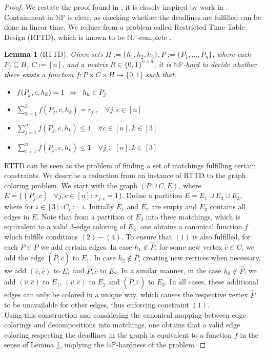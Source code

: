 \documentclass[11pt]{article}
\newcommand{\Hquad}{\hspace{0.5em}}
\newtheorem{lemma}[theorem]{Lemma}
\begin{document}
\begin{proof}
We restate the proof found in \cite{schnaars_21}, it is closely inspired by work in \cite{bonuccelli_01}.\\
Containment in $\mathbb{NP}$ is clear, as checking whether the deadlines are fulfilled can be done in linear time. We reduce from a problem called Restricted Time Table Design (RTTD), which is known to be $\mathbb{NP}$-complete \cite{even_1975}.
\begin{lemma}[RTTD]\label{lemma:rttd}
Given sets $H:= \{h_1,h_2,h_3\}, P := \{P_1,...,P_n\}$, where each $P_j \subseteq H$, $C := [n]$, and a matrix $R \in \{0,1\}^{n \times n}$, it is $\mathbb{NP}$-hard to  decide whether there exists a function $f: P \times C \times H \rightarrow \{0,1\}$ such that:
\begin{itemize}
    \item[(1)] $f(P_j,c,h_k) = 1 \Hquad \Rightarrow \Hquad h_k \in P_j$
    \item[(2)] $\sum_{k=1}^3 f(P_j,c,h_k) = r_{j,c} \quad \forall j,c\in [n]$
    \item[(3)] $\sum_{j=1}^n f(P_j,c,h_k) \le 1 \quad \forall c \in [n], k \in [3]$
    \item[(4)] $\sum_{c=1}^n f(P_j,c,h_k) \le 1 \quad \forall j \in [n], k \in [3]$
\end{itemize}
\end{lemma}
RTTD can be seen as the problem of finding a set of matchings fulfilling certain constraints. We describe a reduction from an instance of RTTD to the graph coloring problem. We start with the graph $(P\cup C, E)$, where $E = \{(P_j,c) \ |\ \forall j,c \in [n]:\ r_{j,c} = 1\}$. Define a partition $E = E_1 \cup E_2 \cup E_3$, where for $i \in [3]: C_i := i$. Initially $E_1$ and $E_2$ are empty and $E_3$ contains all edges in $E$. Note that from a partition of $E_3$ into three matchings, which is equivalent to a valid $3$-edge coloring of $E_3$, one obtains a canonical function $f$ which fulfills conditions $(2)-(4)$. To ensure that $(1)$ is also fulfilled, for each $\hat{P} \in P$ we add certain edges. In case $h_1 \not\in \hat{P}$, for some new vertex $\hat{c} \in C$, we add the edge $(\hat{P},\hat{c})$ to $E_1$. In case $h_2 \not\in \hat{P}$, creating new vertices when necessary, we add $(\hat{v},\hat{c})$ to $E_1$ and $\hat{P},\hat{c}$ to $E_2$. In a similar manner, in the case $h_3 \not\in \hat{P}$, we add $(\hat{v},\hat{c})$ to $E_1$, $(\hat{v},\hat{c})$ to $E_2$ and $(\hat{P}, \hat{c})$ to $E_3$. In all cases, these additional edges can only be colored in a unique way, which causes the respective vertex $\hat{P}$ to be unavailable for other edges, thus enforcing constraint $(1)$.\\
Using this construction and considering the canonical mapping between edge colorings and decompositions into matchings, one obtains that a valid edge coloring respecting the deadlines in the graph is equivalent to a function $f$ in the sense of Lemma \ref{lemma:rttd}, implying the $\mathbb{NP}$-hardness of the problem.
\end{proof}
\end{document}
